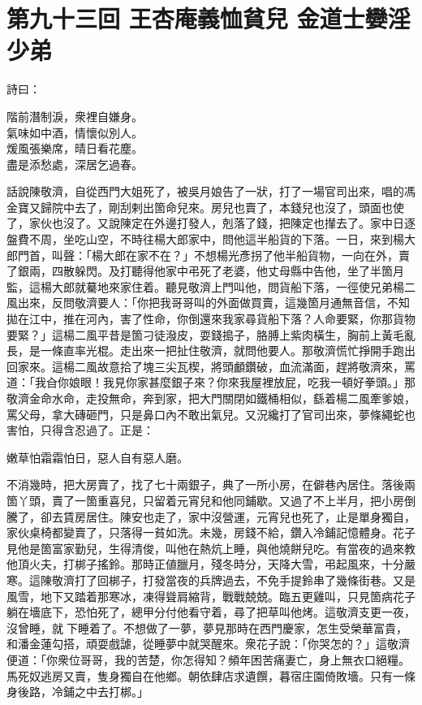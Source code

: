 
\chapter*{第九十三回 王杏庵義恤貧兒 金道士孌淫少弟}


詩曰：

\begin{myquote}
階前潛制淚，衆裡自嫌身。\\氣味如中酒，情懷似別人。\\煖風張樂席，晴日看花塵。\\盡是添愁處，深居乞過春。
\end{myquote}

話說陳敬濟，自從西門大姐死了，被吳月娘告了一狀，打了一場官司出來，唱的馮金寶又歸院中去了，剛刮剌出箇命兒來。{}房兒也賣了，本錢兒也沒了，頭面也使了，家伙也沒了。又說陳定在外邊打發人，剋落了錢，把陳定也攆去了。家中日逐盤費不周，坐吃山空，不時往楊大郎家中，問他這半船貨的下落。一日，來到楊大郎門首，叫聲：「楊大郎在家不在？」不想楊光彥拐了他半船貨物，一向在外，賣了銀兩，四散躲閃。及打聽得他家中弔死了老婆，他丈母縣中告他，坐了半箇月監，這楊大郎就驀地來家住着。聽見敬濟上門叫他，問貨船下落，一徑使兄弟楊二風出來，反問敬濟要人：「你把我哥哥叫的外面做買賣，這幾箇月通無音信，不知拋在江中，推在河內，害了性命，你倒還來我家尋貨船下落？人命要緊，你那貨物要緊？」這楊二風平昔是箇刁徒潑皮，耍錢搗子，胳膊上紫肉橫生，胸前上黃毛亂長，是一條直率光棍。走出來一把扯住敬濟，就問他要人。那敬濟慌忙掙開手跑出回家來。這楊二風故意拾了塊三尖瓦楔，將頭顱鑽破，血流滿面，趕將敬濟來，罵道：「我㒲你娘眼！我見你家甚麼銀子來？你來我屋裡放屁，吃我一頓好拳頭。」那敬濟金命水命，走投無命，奔到家，把大門關閉如鐵桶相似，繇着楊二風牽爹娘，罵父母，拿大磚砸門，只是鼻口內不敢出氣兒。又況纔打了官司出來，夢條繩蛇也害怕，只得含忍過了。正是：

\begin{myquote}
嫩草怕霜霜怕日，惡人自有惡人磨。
\end{myquote}

不消幾時，把大房賣了，找了七十兩銀子，典了一所小房，在僻巷內居住。落後兩箇丫頭，賣了一箇重喜兒，只留着元宵兒和他同鋪歇。又過了不上半月，把小房倒騰了，卻去賃房居住。陳安也走了，家中沒營運，元宵兒也死了，止是單身獨自，家伙桌椅都變賣了，只落得一貧如洗。{}未幾，房錢不給，鑽入冷鋪記憶體身。花子見他是箇富家勤兒，生得清俊，叫他在熱炕上睡，與他燒餅兒吃。有當夜的過來教他頂火夫，打梆子搖鈴。那時正値臘月，殘冬時分，天降大雪，弔起風來，十分嚴寒。這陳敬濟打了回梆子，打發當夜的兵牌過去，不免手提鈴串了幾條街巷。又是風雪，地下又踏着那寒冰，凍得聳肩縮背，戰戰兢兢。臨五更雞叫，只見箇病花子躺在墻底下，恐怕死了，總甲分付他看守着，尋了把草叫他烤。這敬濟支更一夜，沒曾睡，就𢱉下睡着了。不想做了一夢，夢見那時在西門慶家，怎生受榮華富貴，和潘金蓮勾搭，頑耍戲謔，從睡夢中就哭醒來。衆花子說：「你哭怎的？」這敬濟便道：「你衆位哥哥，我的苦楚，你怎得知？頻年困苦痛妻亡，身上無衣口絕糧。馬死奴逃房又賣，隻身獨自在他鄉。朝依肆店求遺饌，暮宿庄園倚敗墻。只有一條身後路，冷鋪之中去打梆。」

